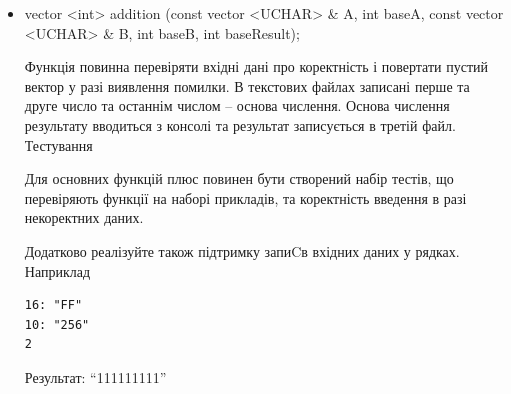 \documentclass[]{article}
\begin{document}
\begin{itemize}
\item
  vector \textless{}int\textgreater{} addition (const vector
  \textless{}UCHAR\textgreater{} \& A, int baseA, const vector
  \textless{}UCHAR\textgreater{} \& B, int baseB, int baseResult);

  Функція повинна перевіряти вхідні дані про коректність і повертати
  пустий вектор у разі виявлення помилки. В текстових файлах записані
  перше та друге число та останнім числом -- основа числення. Основа
  числення результату вводиться з консолі та результат записується в
  третій файл. Тестування

  Для основних функцій плюс повинен бути створений набір тестів, що
  перевіряють функції на наборі прикладів, та коректність введення в
  разі некоректних даних.

  Додатково реалізуйте також підтримку запиCв вхідних даних у рядках.
  Наприклад

\begin{verbatim}
16: "FF"
10: "256"
2
\end{verbatim}

  Результат: ``111111111''
\end{itemize}
\end{document}
